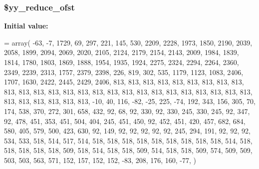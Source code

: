 \subsubsection[{\$yy\+\_\+reduce\+\_\+ofst}]{\setlength{\rightskip}{0pt plus 5cm}\$yy\+\_\+reduce\+\_\+ofst\hspace{0.3cm}{\ttfamily [static]}}\label{class_smarty___internal___templateparser_a3b856b0c76686b62efda7789aae55234}
{\bfseries Initial value\+:}
\begin{DoxyCode}
= array(
    -63,   -7, 1729,   69,  297,  221,  145,  530, 2209, 2228,
   1973, 1850, 2190, 2039, 2058, 1899, 2094, 2069, 2020, 2105,
   2124, 2179, 2154, 2143, 2009, 1984, 1839, 1814, 1780, 1803,
   1869, 1888, 1954, 1935, 1924, 2275, 2324, 2294, 2264, 2360,
   2349, 2239, 2313, 1757, 2379, 2398,  226,  819,  302,  535,
   1179, 1123, 1083, 2406, 1707, 1630, 2422, 2445, 2429, 2406,
    813,  813,  813,  813,  813,  813,  813,  813,  813,  813,
    813,  813,  813,  813,  813,  813,  813,  813,  813,  813,
    813,  813,  813,  813,  813,  813,  813,  813,  813,  813,
    813,  813,  -10,   40,  116,  -82,  -25,  225,  -74,  192,
    343,  156,  305,   70,  174,  538,  370,  272,  301,  658,
    432,   92,   68,   92,  330,   92,  330,  245,  330,  245,
     92,  347,   92,  478,  451,  353,  451,  504,  404,  245,
    451,  450,   92,  452,  451,  420,  457,  682,  684,  580,
    405,  579,  500,  423,  630,   92,  149,   92,   92,   92,
     92,   92,  245,  294,  191,   92,   92,   92,  534,  533,
    518,  514,  517,  514,  518,  518,  518,  518,  518,  518,
    518,  518,  518,  514,  518,  518,  518,  518,  518,  509,
    518,  514,  518,  518,  509,  514,  518,  518,  509,  574,
    509,  509,  503,  503,  563,  571,  152,  157,  152,  152,
    -83,  208,  176,  160,  -77,
)
\end{DoxyCode}
\hypertarget{class_smarty___internal___templateparser_a2209e68ce0fccc5f4739e063ee42ef0e}{}
